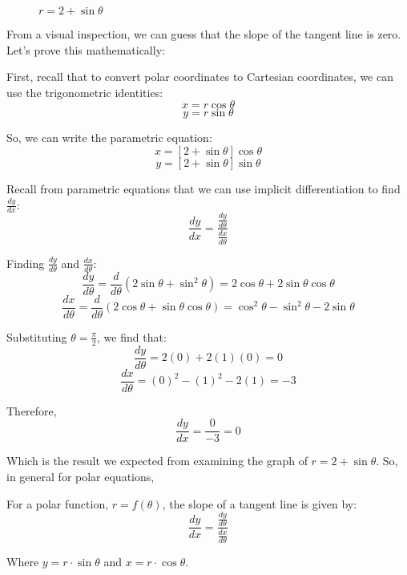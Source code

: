 \begin{figure}[htbp]
\centering
    \caption{$r = 2 + \sin{\theta}$}
    \label{fig:cardioid}
    \end{figure}

From a visual inspection, we can guess that the slope of the tangent line is 
zero. Let's prove this mathematically:

First, recall that to convert polar coordinates to Cartesian coordinates, we 
can use the trigonometric identities:
$$x = r\cos{\theta}$$
$$y = r\sin{\theta}$$

So, we can write the parametric equation:
$$x = \left[2 + \sin{\theta} \right]\cos{\theta}$$
$$y = \left[ 2 + \sin{\theta} \right]\sin{\theta}$$

Recall from parametric equations that we can use implicit differentiation to 
find $\frac{dy}{dx}$:
$$\frac{dy}{dx} = \frac{\frac{dy}{d\theta}}{\frac{dx}{d\theta}}$$

Finding $\frac{dy}{d\theta}$ and $\frac{dx}{d\theta}$:
$$\frac{dy}{d\theta} = \frac{d}{d\theta} \left( 2\sin{\theta} + \sin^2{\theta} 
\right) = 2\cos{\theta} + 2\sin{\theta}\cos{\theta}$$
$$\frac{dx}{d\theta} = \frac{d}{d\theta} \left( 2\cos{\theta} + \sin{\theta}
\cos{\theta} \right) = \cos^2{\theta} - \sin^2{\theta} - 2\sin{\theta}$$

Substituting $\theta = \frac{\pi}{2}$, we find that:
$$\frac{dy}{d\theta} = 2(0) + 2(1)(0) = 0$$
$$\frac{dx}{d\theta} = (0)^2 - (1)^2 - 2(1) = -3$$

Therefore,
$$\frac{dy}{dx} = \frac{0}{-3} = 0$$

Which is the result we expected from examining the graph of $r = 2 + \sin{
\theta}$. 
So, in general for polar equations, 
\begin{mdframed}[style=important, frametitle={Tangent to a Polar Function}]
For a polar function, $r = f(\theta)$, the slope of a tangent line is given by:
$$\frac{dy}{dx} = \frac{\frac{dy}{d\theta}}{\frac{dx}{d\theta}}$$

Where $y = r \cdot \sin{\theta}$ and $x = r \cdot \cos{\theta}$. 
\end{mdframed}

